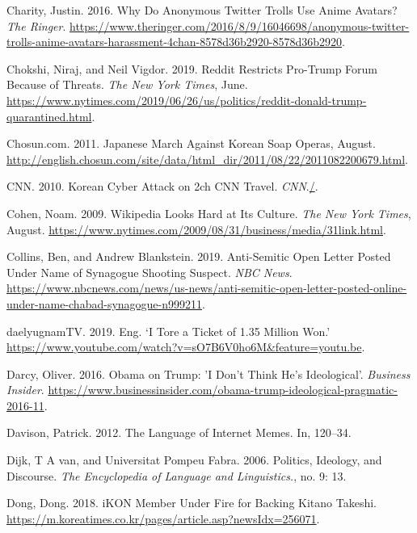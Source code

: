 \documentclass[10pt,british,A4paper,,openany]{memoir}
\begin{document}
\hypertarget{ref-charity_why_2016}{}
Charity, Justin. 2016. Why Do Anonymous Twitter Trolls Use Anime
Avatars? \emph{The Ringer}.
\url{https://www.theringer.com/2016/8/9/16046698/anonymous-twitter-trolls-anime-avatars-harassment-4chan-8578d36b2920-8578d36b2920}.

\hypertarget{ref-chokshi_reddit_2019}{}
Chokshi, Niraj, and Neil Vigdor. 2019. Reddit Restricts Pro-Trump Forum
Because of Threats. \emph{The New York Times}, June.
\url{https://www.nytimes.com/2019/06/26/us/politics/reddit-donald-trump-quarantined.html}.

\hypertarget{ref-chosun.com_japanese_2011}{}
Chosun.com. 2011. Japanese March Against Korean Soap Operas, August.
\url{http://english.chosun.com/site/data/html_dir/2011/08/22/2011082200679.html}.

\hypertarget{ref-cnn_korean_2010}{}
CNN. 2010. Korean Cyber Attack on 2ch CNN Travel.
\emph{CNN}.\href{./}{/}.

\hypertarget{ref-cohen_wikipedia_2009}{}
Cohen, Noam. 2009. Wikipedia Looks Hard at Its Culture. \emph{The New
York Times}, August.
\url{https://www.nytimes.com/2009/08/31/business/media/31link.html}.

\hypertarget{ref-collins_anti-semitic_2019}{}
Collins, Ben, and Andrew Blankstein. 2019. Anti-Semitic Open Letter
Posted Under Name of Synagogue Shooting Suspect. \emph{NBC News}.
\url{https://www.nbcnews.com/news/us-news/anti-semitic-open-letter-posted-online-under-name-chabad-synagogue-n999211}.

\hypertarget{ref-daelyugnamtv_eng._2019}{}
daelyugnamTV. 2019. Eng. `I Tore a Ticket of 1.35 Million Won.'
\url{https://www.youtube.com/watch?v=sO7B6V0ho6M\&feature=youtu.be}.

\hypertarget{ref-darcy_obama_2016}{}
Darcy, Oliver. 2016. Obama on Trump: 'I Don't Think He's Ideological'.
\emph{Business Insider}.
\url{https://www.businessinsider.com/obama-trump-ideological-pragmatic-2016-11}.

\hypertarget{ref-davison_language_2012}{}
Davison, Patrick. 2012. The Language of Internet Memes. In, 120--34.

\hypertarget{ref-van_dijk_politics_2006}{}
Dijk, T A van, and Universitat Pompeu Fabra. 2006. Politics, Ideology,
and Discourse. \emph{The Encyclopedia of Language and Linguistics.}, no.
9: 13.

\hypertarget{ref-dong_ikon_2018}{}
Dong, Dong. 2018. iKON Member Under Fire for Backing Kitano Takeshi.
\url{https://m.koreatimes.co.kr/pages/article.asp?newsIdx=256071}.
\end{document}
